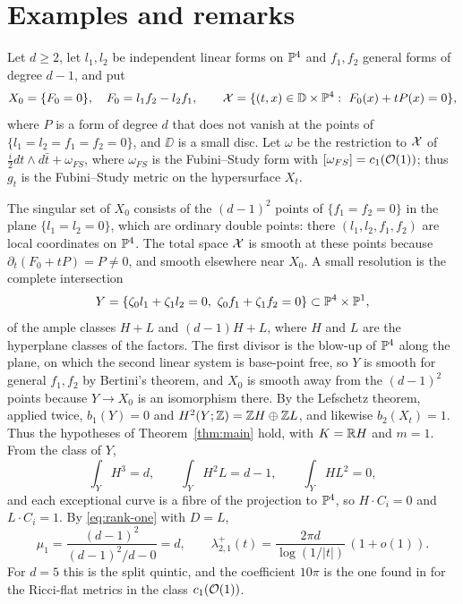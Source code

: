 \section{Examples and remarks}\label{sec:examples}

\begin{example}\label{ex:determinantal}
Let $d\ge2$, let $l_1,l_2$ be independent linear forms on $\mathbb P^4$ and
$f_1,f_2$ general forms of degree $d-1$, and put
\[
 X_0=\{F_0=0\},\quad F_0=l_1f_2-l_2f_1,\qquad
 \mathcal X=\{(t,x)\in\mathbb D\times\mathbb P^4:\ F_0(x)+tP(x)=0\},
\]
where $P$ is a form of degree $d$ that does not vanish at the points of
$\{l_1=l_2=f_1=f_2=0\}$, and $\DD$ is a small disc. Let $\omega$ be the
restriction to $\mathcal X$ of $\tfrac i2dt\wedge d\bar t+\omega_{FS}$, where
$\omega_{FS}$ is the Fubini--Study form with $[\omega_{FS}]=c_1(\mathcal O(1))$;
thus $g_t$ is the Fubini--Study metric on the hypersurface $X_t$.

The singular set of $X_0$ consists of the $(d-1)^2$ points of
$\{f_1=f_2=0\}$ in the plane $\{l_1=l_2=0\}$, which are ordinary double
points: there $(l_1,l_2,f_1,f_2)$ are local coordinates on $\mathbb P^4$. The
total space $\mathcal X$ is smooth at these points because
$\partial_t(F_0+tP)=P\ne0$, and smooth elsewhere near $X_0$. A small
resolution is the complete intersection
\[
 Y=\{\zeta_0l_1+\zeta_1l_2=0,\ \zeta_0f_1+\zeta_1f_2=0\}
 \subset\PP^4\times\PP^1 ,
\]
of the ample classes $H+L$ and $(d-1)H+L$, where $H$ and $L$ are the
hyperplane classes of the factors. The first divisor is the blow-up of
$\mathbb P^4$ along the plane, on which the second linear system is base-point
free, so $Y$ is smooth for general $f_1,f_2$ by Bertini's theorem, and
$X_0$ is smooth away from the $(d-1)^2$ points because $Y\to X_0$ is an
isomorphism there. By the Lefschetz theorem, applied
twice, $b_1(Y)=0$ and $H^2(Y;\mathbb Z)=\mathbb Z H\oplus\mathbb Z L$, and likewise
$b_2(X_t)=1$. Thus the hypotheses of Theorem~\ref{thm:main} hold, with
$K=\mathbb R H$ and $m=1$. From the class of $Y$,
\[
 \int_YH^3=d,\qquad\int_YH^2L=d-1,\qquad\int_YHL^2=0,
\]
and each exceptional curve is a fibre of the projection to $\mathbb P^4$, so
$H\cdot C_i=0$ and $L\cdot C_i=1$. By \eqref{eq:rank-one} with $D=L$,
\[
 \mu_1=\frac{(d-1)^2}{(d-1)^2/d-0}=d,\qquad
 \lambda^+_{2,1}(t)=\frac{2\pi d}{\log(1/|t|)}\,(1+o(1)).
\]
For $d=5$ this is the split quintic, and the coefficient $10\pi$ is the
one found in \cite{wuebben-conifold} for the Ricci-flat metrics in the
class $c_1(\mathcal O(1))$.
\end{example}

